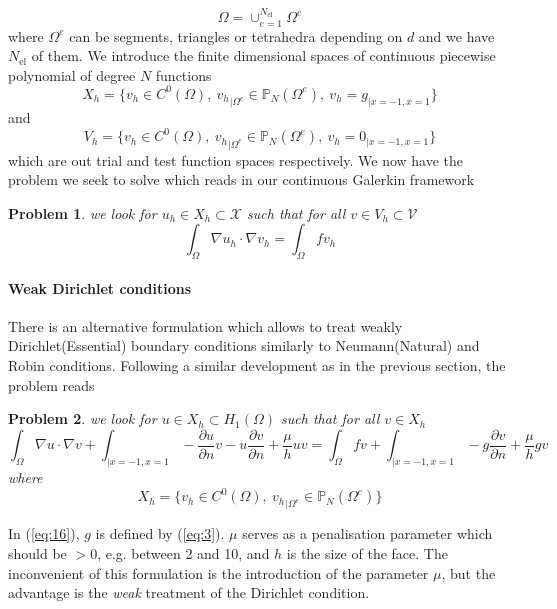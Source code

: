 \documentclass[a4paper]{book}
\newtheorem{problem}{Problem}
\newcommand{\nel}{{\ensuremath{N_{\text{el}}}}\xspace}
\begin{document}
\begin{equation}
  \label{eq:10}
  \Omega = \cup_{e=1}^\nel \Omega^e
\end{equation}
where $\Omega^e$ can be segments, triangles or tetrahedra depending on
$d$ and we have $\nel$ of them. We introduce the finite dimensional
spaces of continuous piecewise polynomial of degree $N$ functions
\begin{equation}
  \label{eq:17}
  X_h = \Big\{ v_h  \in C^0(\Omega),\ {v_h}_{|\Omega^e} \in \mathbb{P}_N( \Omega^e ),\   v_h=g_{|x=-1,x=1}\Big\}
\end{equation}
and
\begin{equation}
  \label{eq:18}
  V_h = \Big\{ v_h \in C^0(\Omega),\ {v_h}_{|\Omega^e} \in \mathbb{P}_N( \Omega^e ),\   v_h=0_{|x=-1,x=1}\Big\}
\end{equation}
which are out trial and test function spaces respectively.  We now
have the problem we seek to solve which reads in our continuous
Galerkin framework
\begin{problem}
  \label{prob:2}
  we look for $u_h \in X_h \subset \mathcal{X}$ such that for all $v
  \in V_h \subset \mathcal{V}$
  \begin{equation}
    \label{eq:20}
    \int_\Omega \nabla u_h \cdot \nabla v_h  = \int_\Omega f v_h
  \end{equation}
\end{problem}

\paragraph{Weak Dirichlet conditions}
\label{sec:weak-dirichl-cond}

There is an alternative formulation which allows to treat weakly
Dirichlet(Essential) boundary conditions similarly to Neumann(Natural)
and Robin conditions. Following a similar development as in the previous section, the problem reads
\begin{problem}
  \label{prob:3}
  we look for $u \in X_h \subset H_1(\Omega)$ such that for all $v \in
  X_h$
\begin{equation}
  \label{eq:16}
  \int_\Omega \nabla u \cdot \nabla v +
  \int_{|x=-1,x=1} -\frac{\partial u}{\partial n} v - u \frac{\partial v}{\partial n} + \frac{\mu}{h} u v
  =
  \int_\Omega f v +
  \int_{|x=-1,x=1}  - g \frac{\partial v}{\partial n} + \frac{\mu}{h} g v
\end{equation}
where
\begin{equation}
  \label{eq:19}
  X_h = \Big\{ v_h \in C^0(\Omega),\ {v_h}_{|\Omega^e} \in \mathbb{P}_N( \Omega^e ) \Big\}
\end{equation}
\end{problem}
In (\ref{eq:16}), $g$ is defined by (\ref{eq:3}). $\mu$ serves as a penalisation
parameter which should be $> 0$, e.g. between 2 and 10, and $h$ is the
size of the face. The inconvenient of this formulation is the
introduction of the parameter $\mu$, but the advantage is the
\emph{weak} treatment of the Dirichlet condition.
\end{document}
